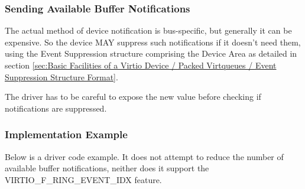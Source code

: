 \subsubsection{Sending Available Buffer Notifications}\label{sec:Basic Facilities
of a Virtio Device / Packed Virtqueues / Supplying Buffers to The Device
/ Sending Available Buffer Notifications}

The actual method of device notification is bus-specific, but generally
it can be expensive.  So the device MAY suppress such notifications if it
doesn't need them, using the Event Suppression structure comprising the
Device Area as detailed in section \ref{sec:Basic
Facilities of a Virtio Device / Packed Virtqueues / Event
Suppression Structure Format}.

The driver has to be careful to expose the new 
value before checking if notifications are suppressed.

\subsubsection{Implementation Example}\label{sec:Basic Facilities of a Virtio Device / Packed Virtqueues / Supplying Buffers to The Device / Implementation Example}

Below is a driver code example. It does not attempt to reduce
the number of available buffer notifications, neither does it support
the VIRTIO_F_RING_EVENT_IDX feature.

